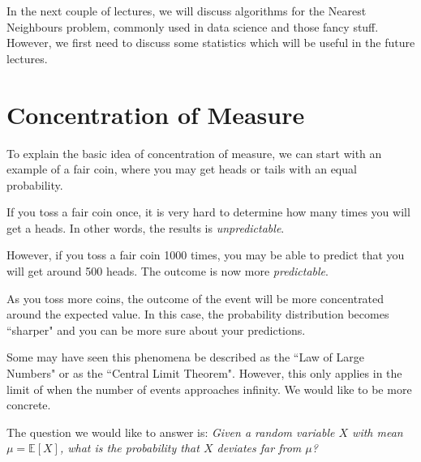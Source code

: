 \documentclass[12pt]{article}
\begin{document}
\MakeScribeTop

In the next couple of lectures, we will discuss algorithms for the Nearest Neighbours problem, commonly used in data science and those fancy stuff. However, we first need to discuss some statistics which will be useful in the future lectures. 

\section{Concentration of Measure}

To explain the basic idea of concentration of measure, we can start with an example of a fair coin, where you may get heads or tails with an equal probability.

If you toss a fair coin once, it is very hard to determine how many times you will get a heads. In other words, the results is \textit{unpredictable}.

However, if you toss a fair coin 1000 times, you may be able to predict that you will get around 500 heads. The outcome is now more \textit{predictable}.

As you toss more coins, the outcome of the event will be more concentrated around the expected value. In this case, the probability distribution becomes ``sharper" and you can be more sure about your predictions. 

Some may have seen this phenomena be described as the ``Law of Large Numbers" or as the ``Central Limit Theorem". However, this only applies in the limit of when the number of events approaches infinity. We would like to be more concrete.

The question we would like to answer is: \textit{Given a random variable $X$ with mean $\mu = \mathbb{E}[X]$, what is the probability that $X$ deviates far from $\mu$?}

\newcommand{\expected}{\mathbb{E}}
\newcommand{\probab}{\mathbb{P}}
\end{document}
